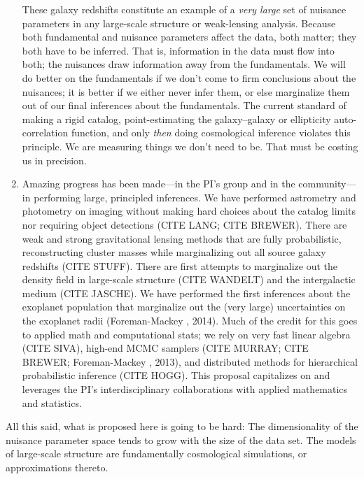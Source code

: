 \documentclass[12pt]{article}
\begin{document}
\begin{enumerate}
These galaxy redshifts constitute an example of a \emph{very large}
set of nuisance parameters in any large-scale structure or
weak-lensing analysis.
Because both fundamental and nuisance parameters affect the data, both
matter; they both have to be inferred.
That is, information in the data must flow into both; the nuisances
draw information away from the fundamentals.
We will do better on the fundamentals if we don't come to firm
conclusions about the nuisances; it is better if we either never infer
them, or else marginalize them out of our final inferences about the
fundamentals.
The current standard of making a rigid catalog, point-estimating the
galaxy--galaxy or ellipticity auto-correlation function, and only
\emph{then} doing cosmological inference violates this principle.
We are measuring things we don't need to be.
That must be costing us in precision.
\item
Amazing progress has been made---in the PI's group and in the
community---in performing large, principled inferences.
We have performed astrometry and photometry on imaging without making
hard choices about the catalog limits nor requiring object detections
(CITE LANG; CITE BREWER).
There are weak and strong gravitational lensing methods that are fully
probabilistic, reconstructing cluster masses while marginalizing out
all source galaxy redshifts (CITE STUFF).
There are first attempts to marginalize out the density field in
large-scale structure (CITE WANDELT) and the intergalactic medium
(CITE JASCHE).
We have performed the first inferences about the exoplanet population
that marginalize out the (very large) uncertainties on the exoplanet
radii (Foreman-Mackey \etal, 2014).
Much of the credit for this goes to applied math and computational
stats; we rely on very fast linear algebra (CITE SIVA), high-end MCMC
samplers (CITE MURRAY; CITE BREWER; Foreman-Mackey \etal, 2013), and distributed methods
for hierarchical probabilistic inference (CITE HOGG).
This proposal capitalizes on and leverages the PI's interdisciplinary
collaborations with applied mathematics and statistics.
\end{enumerate}

All this said, what is proposed here is going to be hard:
The dimensionality of the nuisance parameter space tends to grow with
the size of the data set.
The models of large-scale structure are fundamentally cosmological
simulations, or approximations thereto.
\end{document}
